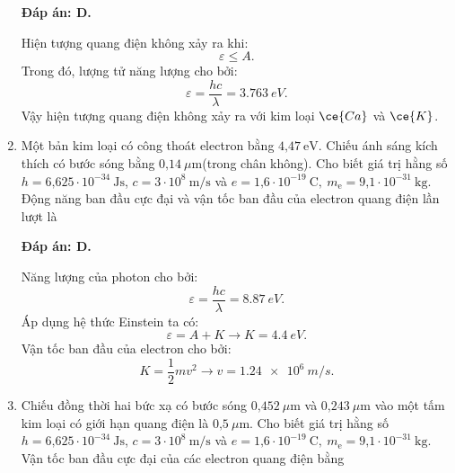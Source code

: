 \begin{enumerate}[label=\bfseries Câu \arabic*:]
	\loigiai
	{		\textbf{Đáp án: D.}
		
Hiện tượng quang điện không xảy ra khi:
$$
	\varepsilon \leq A.
$$
Trong đó, lượng tử năng lượng cho bởi:
$$
	\varepsilon = \dfrac{hc}{\lambda} = \SI{3,763}{eV}.
$$
Vậy hiện tượng quang điện không xảy ra với kim loại $ \ce{Ca} $ và $ \ce{K} $.
	}
	
\item {} 
	\cauhoi
	{Một bản kim loại có công thoát electron bằng $\text{4,47}\ \text{eV}$. Chiếu ánh sáng kích thích có bước sóng bằng $\text{0,14}\ \mu\text{m}$(trong chân không). Cho biết giá trị hằng số $h=\text{6,625}\cdot 10^{-34}\ \text{Js}$, $c=3\cdot 10^8\ \text{m/s}$ và $e=\text{1,6}\cdot 10^{-19}\ \text{C}, \ m_\text{e}=\text{9,1}\cdot 10^{-31}\ \text{kg}$. Động năng ban đầu cực đại và vận tốc ban đầu của electron quang điện lần lượt là
	}
	
	\loigiai
	{		\textbf{Đáp án: D.}

Năng lượng của photon cho bởi:
$$
	\varepsilon = \dfrac{hc}{\lambda} = \SI{8.87}{eV}.
$$
Áp dụng hệ thức Einstein ta có:
$$
	\varepsilon = A + K \rightarrow K = \SI{4,4}{eV}.
$$
Vận tốc ban đầu của electron cho bởi:
$$
	K = \dfrac{1}{2}mv^{2} \rightarrow v = \SI{1,24 e6}{m/s}.
$$
	}
	
	\item {} 
		\cauhoi
	{Chiếu đồng thời hai bức xạ có bước sóng $\text{0,452}\ \mu \text{m}$   và $\text{0,243}\ \mu\text{m}$ vào một tấm kim loại có giới hạn quang điện là $\text{0,5}\ \mu\text{m}$. Cho biết giá trị hằng số $h=\text{6,625}\cdot 10^{-34}\ \text{Js}$, $c=3\cdot 10^8\ \text{m/s}$ và $e=\text{1,6}\cdot 10^{-19}\ \text{C}, \ m_\text{e}=\text{9,1}\cdot 10^{-31}\ \text{kg}$. Vận tốc ban đầu cực đại của các electron quang điện bằng
	}
	

\end{enumerate}
